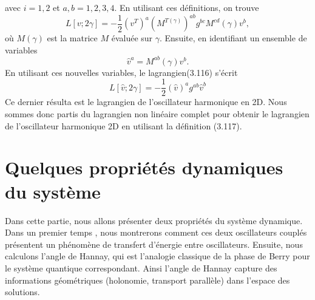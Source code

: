 \documentclass[12pt,a4paper, openany]{report}
\begin{document}
	avec $i=1,2$ et $a,b=1,2,3,4$. En utilisant ces définitions, on trouve 
	\begin{equation}
		L[v;2\gamma]=-\frac{1}{2}\left(v^{T}\right)^a \left(M^{{T}(\gamma)}\right)^{ab}	g^{bc}M^{cd}(\gamma)v^b ,
	\end{equation}
	où $M(\gamma)$ est la matrice $M$ évaluée sur $\gamma$. Ensuite, en identifiant un ensemble de variables
	\begin{equation}
		\hat{v}^a=M^{ab}(\gamma)v^b.
	\end{equation} En utilisant ces nouvelles variables, le lagrangien(3.116) s'écrit 
	\begin{equation}
		L[\hat{v};2\gamma]=-\frac{1}{2}\left(\hat{v}\right)^{a}	g^{ab}\hat{v}^{b}
	\end{equation} Ce dernier résulta est le lagrangien de l'oscillateur harmonique en 2D. Nous sommes donc partis du lagrangien non linéaire complet pour obtenir le lagrangien de l'oscillateur harmonique 2D en utilisant la définition (3.117).

\section{Quelques propriétés dynamiques du système}
Dans cette partie, nous allons présenter deux propriétés du système dynamique. Dans un premier temps , nous montrerons comment ces deux oscillateurs couplés présentent un phénomène de transfert d'énergie entre oscillateurs. Ensuite, nous calculons l'angle de Hannay, qui est l'analogie classique de la phase de Berry pour le système quantique correspondant. Ainsi l'angle de Hannay capture des informations géométriques (holonomie, transport parallèle) dans l'espace des solutions.
\end{document}
